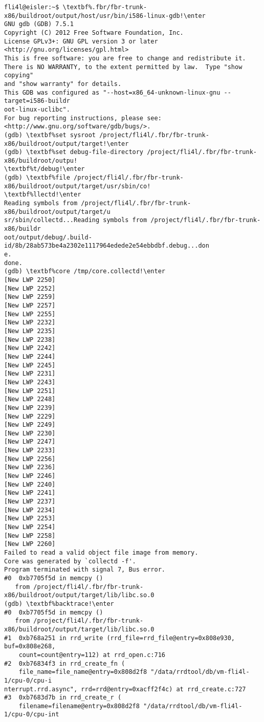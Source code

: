 \begin{example}
\begin{Verbatim}[commandchars=\\\%!]
fli4l@eisler:~$ \textbf%.fbr/fbr-trunk-x86/buildroot/output/host/usr/bin/i586-linux-gdb!\enter
GNU gdb (GDB) 7.5.1
Copyright (C) 2012 Free Software Foundation, Inc.
License GPLv3+: GNU GPL version 3 or later <http://gnu.org/licenses/gpl.html>
This is free software: you are free to change and redistribute it.
There is NO WARRANTY, to the extent permitted by law.  Type "show copying"
and "show warranty" for details.
This GDB was configured as "--host=x86_64-unknown-linux-gnu --target=i586-buildr
oot-linux-uclibc".
For bug reporting instructions, please see:
<http://www.gnu.org/software/gdb/bugs/>.
(gdb) \textbf%set sysroot /project/fli4l/.fbr/fbr-trunk-x86/buildroot/output/target!\enter
(gdb) \textbf%set debug-file-directory /project/fli4l/.fbr/fbr-trunk-x86/buildroot/outpu!
\textbf%t/debug!\enter
(gdb) \textbf%file /project/fli4l/.fbr/fbr-trunk-x86/buildroot/output/target/usr/sbin/co!
\textbf%llectd!\enter
Reading symbols from /project/fli4l/.fbr/fbr-trunk-x86/buildroot/output/target/u
sr/sbin/collectd...Reading symbols from /project/fli4l/.fbr/fbr-trunk-x86/buildr
oot/output/debug/.build-id/8b/28ab573be4a2302e1117964edede2e54ebbdbf.debug...don
e.
done.
(gdb) \textbf%core /tmp/core.collectd!\enter
[New LWP 2250]
[New LWP 2252]
[New LWP 2259]
[New LWP 2257]
[New LWP 2255]
[New LWP 2232]
[New LWP 2235]
[New LWP 2238]
[New LWP 2242]
[New LWP 2244]
[New LWP 2245]
[New LWP 2231]
[New LWP 2243]
[New LWP 2251]
[New LWP 2248]
[New LWP 2239]
[New LWP 2229]
[New LWP 2249]
[New LWP 2230]
[New LWP 2247]
[New LWP 2233]
[New LWP 2256]
[New LWP 2236]
[New LWP 2246]
[New LWP 2240]
[New LWP 2241]
[New LWP 2237]
[New LWP 2234]
[New LWP 2253]
[New LWP 2254]
[New LWP 2258]
[New LWP 2260]
Failed to read a valid object file image from memory.
Core was generated by `collectd -f'.
Program terminated with signal 7, Bus error.
#0  0xb7705f5d in memcpy ()
   from /project/fli4l/.fbr/fbr-trunk-x86/buildroot/output/target/lib/libc.so.0
(gdb) \textbf%backtrace!\enter
#0  0xb7705f5d in memcpy ()
   from /project/fli4l/.fbr/fbr-trunk-x86/buildroot/output/target/lib/libc.so.0
#1  0xb768a251 in rrd_write (rrd_file=rrd_file@entry=0x808e930, buf=0x808e268,
    count=count@entry=112) at rrd_open.c:716
#2  0xb76834f3 in rrd_create_fn (
    file_name=file_name@entry=0x808d2f8 "/data/rrdtool/db/vm-fli4l-1/cpu-0/cpu-i
nterrupt.rrd.async", rrd=rrd@entry=0xacff2f4c) at rrd_create.c:727
#3  0xb7683d7b in rrd_create_r (
    filename=filename@entry=0x808d2f8 "/data/rrdtool/db/vm-fli4l-1/cpu-0/cpu-int

\end{Verbatim}
\end{example}
